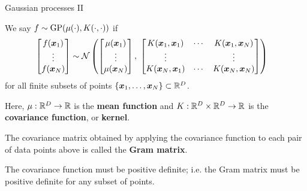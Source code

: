 \documentclass[aspectratio=169]{beamer}
\begin{document}
\begin{frame}{Gaussian processes II}

We say $f \sim \mathrm{GP}(\mu(\cdot), K(\cdot, \cdot))$ if
\begin{align}
    \begin{bmatrix}
    f(\boldsymbol{x}_1) \\ \vdots \\ f(\boldsymbol{x}_N)
    \end{bmatrix} 
    &\sim 
    \mathcal{N} \left(
    \begin{bmatrix}
    \mu(\boldsymbol{x}_1) \\ \vdots \\ \mu(\boldsymbol{x}_N)
    \end{bmatrix}, \;
    \begin{bmatrix}
    K(\boldsymbol{x}_1, \boldsymbol{x}_1) & \cdots & K(\boldsymbol{x}_1, \boldsymbol{x}_N) \\ 
    \vdots & & \vdots \\ 
    K(\boldsymbol{x}_N, \boldsymbol{x}_1) & \cdots & K(\boldsymbol{x}_N, \boldsymbol{x}_N) 
    \end{bmatrix}
    \right)
\end{align}
for all finite subsets of points $\{\boldsymbol{x}_1, \ldots, \boldsymbol{x}_N\} \subset \mathbb{R}^D$.

Here, $\mu: \mathbb{R}^D \to \mathbb{R}$ is the \textbf{mean function} and $K: \mathbb{R}^D \times \mathbb{R}^D \to \mathbb{R}$ is the \textbf{covariance function}, or \textbf{kernel}.

The covariance matrix obtained by applying the covariance function to each pair of data points above is called the \textbf{Gram matrix}.

The covariance function must be positive definite; i.e. the Gram matrix must be positive definite for any subset of points. 

\end{frame}
\end{document}
